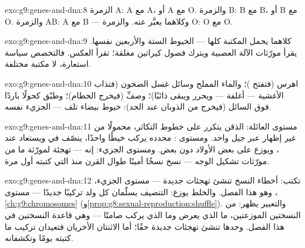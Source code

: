 \begin{solution}{exo:g9:genes-and-dna:8}
الزمرة A: A مع A، أو A مع O. والزمرة B: B مع B، أو B مع
O. والزمرة AB: A مع B --- وكلاهما يعبَّر عنه. والزمرة
O: O مع O.
\end{solution}

\begin{solution}{exo:g9:genes-and-dna:9}
كلاهما يحمل المكتبة كلها --- الخيوط الستة والأربعين
نفسها.  يقرأ مورّثات الآلة العصبية ويترك فصول
كيراتين  مغلقة؛   تقرأ العكس. فالتخصص
سياسة استعارة، لا مكتبة مختلفة.
\end{solution}

\begin{solution}{exo:g9:genes-and-dna:10}
اهرس  (فتفتح )؛ والماء المملح وسائل غسل
الصحون (فتذاب الأغشية --- أغلفة   ---
ويحرر  ويبقى ذائبًا)؛ وصفِّ (فيخرج الحطام)؛ وطبّق
كحولًا باردًا فوق السائل (فيخرج  من الذوبان عند
الحد): خيوط بيضاء تلف --- الجزيء نفسه.
\end{solution}

\begin{solution}{exo:g9:genes-and-dna:11}
مستوى العائلة: الذقن يتكرر على خطوط التكاثر، محمولًا من
غير إظهار عبر جيل واحد. ومستوى : محدده يركب
خيطًا واحدًا، ينصّف في  ويستعاد عند ،
ويوزع على بعض الأولاد دون بعض. ومستوى الجزيء: إنه 
--- تهجئة لمورّثة ما من مورّثات تشكيل الوجه --- نسخ
نسخًا أمينًا طوال القرن منذ  التي كتبته أول مرة.
\end{solution}

\begin{solution}{exo:g9:genes-and-dna:12}
 تكتب: أخطاء النسخ تنشئ تهجئات جديدة --- مستوى
الجزيء، وهو هذا الفصل. والخلط يوزع: التنصيف 
يسلّمان كل ولد تركيبًا جديدًا --- مستوى ،
\cref{ch:g9:chromosomes}
(و\cref{prop:g8:sexual-reproduction:shuffle}). والتعبير
يظهر: من النسختين الموزعتين، ما الذي يعرض وما الذي يركب
صامتًا --- وهي قاعدة النسختين في هذا الفصل. 
وحدها تنشئ تهجئات جديدة حقًا؛ أما الاثنتان الأخريان
فتعيدان تركيب ما كتبته  يومًا وتكشفانه.
\end{solution}

